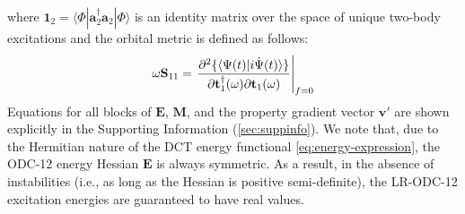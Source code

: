 where
\(
    \mathbf{1}_2
    =
    \langle\Phi|\mathbf{a}_2^\dagger \mathbf{a}_2|\Phi\rangle
\)
is an identity matrix over the space of unique two-body excitations and the
orbital metric is defined as follows:
\begin{equation}
    \label{eq:metric-blocks}
    \omega\mathbf{S}_{11}
    =
    \left.
        \frac{\partial^2 \{\langle\Psi(t)|i\dot\Psi(t)\rangle\}}{%
            \partial \mathbf{t}_1^\dagger(\omega)
            \partial \mathbf{t}_1(\omega)
        }
    \right|_{f=0}
\end{equation}
Equations for all blocks of $\mathbf{E}$, $\mathbf{M}$, and the property
gradient vector $\mathbf{v}'$ are shown explicitly in the Supporting
Information (\cref{sec:suppinfo}).
We note that, due to the Hermitian nature of the DCT energy functional
\eqref{eq:energy-expression}, the ODC-12 energy Hessian $\mathbf{E}$ is always
symmetric.
As a result, in the absence of instabilities (i.e., as long as the Hessian is
positive semi-definite), the LR-ODC-12 excitation energies are guaranteed to
have real values.

